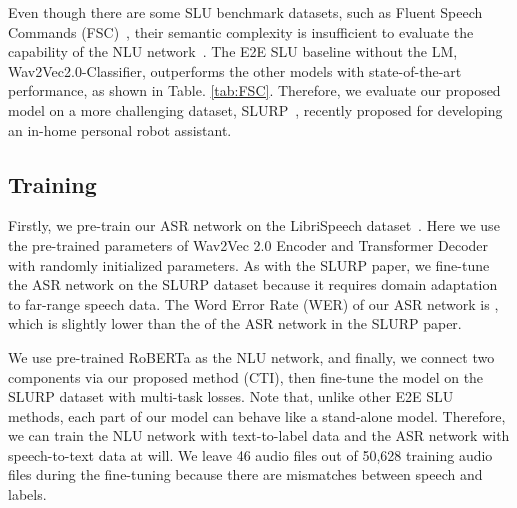 \documentclass{article}
\begin{document}
Even though there are some SLU benchmark datasets, such as Fluent Speech Commands (FSC)~\cite{Lugosch2019}, their semantic complexity is insufficient to evaluate the capability of the NLU network~\cite{saxon2021end,mckenna2020semantic}.
The E2E SLU baseline without the LM, Wav2Vec2.0-Classifier, outperforms the other models with state-of-the-art performance, as shown in Table. \ref{tab:FSC}.
Therefore, we evaluate our proposed model on a more challenging dataset, SLURP~\cite{bastianelli2020slurp}, recently proposed for developing an in-home personal robot assistant. 


















     


    
    


\vspace{-4mm}
\subsection{Training}





Firstly, we pre-train our ASR network on the LibriSpeech dataset~\cite{panayotov2015librispeech}. 
Here we use the pre-trained parameters of Wav2Vec 2.0 Encoder and Transformer Decoder with randomly initialized parameters.
As with the SLURP paper, we fine-tune the ASR network on the SLURP dataset because it requires domain adaptation to far-range speech data.
The Word Error Rate (WER) of our ASR network is , which is slightly lower than the  of the ASR network in the SLURP paper.


We use pre-trained RoBERTa as the NLU network, and finally, we connect two components via our proposed method (CTI), then fine-tune the model on the SLURP dataset with multi-task losses.
Note that, unlike other E2E SLU methods, each part of our model can behave like a stand-alone model.
Therefore, we can train the NLU network with text-to-label data and the ASR network with speech-to-text data at will.
We leave 46 audio files out of 50,628 training audio files during the fine-tuning because there are mismatches between speech and labels.
\end{document}

